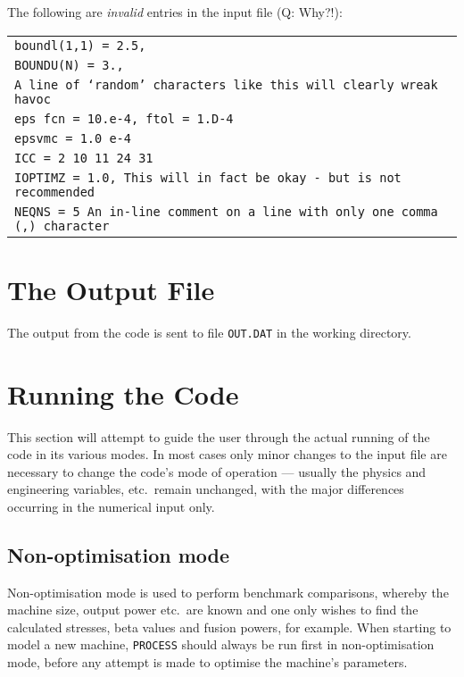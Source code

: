 \documentclass[11pt,a4paper]{report}
\newcommand{\process}{\mbox{\texttt{PROCESS}}}
\begin{document}
The following are \textit{invalid}\/ entries in the input file
(Q: Why?!):
\begin{center}
\begin{tabular}{||l}
$\!\!$\texttt{boundl(1,1) = 2.5,} \\
$\!\!$\texttt{BOUNDU(N) = 3.,} \\
$\!\!$\texttt{A line of `random' characters like this will clearly wreak havoc} \\
$\!\!$\texttt{eps fcn = 10.e-4, ftol = 1.D-4} \\
$\!\!$\texttt{epsvmc = 1.0 e-4} \\
$\!\!$\texttt{ICC =   2  10  11  24  31} \\
$\!\!$\texttt{IOPTIMZ = 1.0,  This will in fact be okay - but is not recommended} \\
$\!\!$\texttt{NEQNS = 5    An in-line comment on a line with only one comma (,) character} \\
\end{tabular}
\end{center}

\section{The Output File}

The output from the code is sent to file \texttt{OUT.DAT} in the working
directory.

\section{Running the Code}

This section will attempt to guide the user through the actual running of the
code in its various modes. In most cases only minor changes to the input file
are necessary to change the code's mode of operation --- usually the physics
and engineering variables, etc.\ remain unchanged, with the major differences
occurring in the numerical input only.

\subsection{Non-optimisation mode}

Non-optimisation mode is used to perform benchmark comparisons, whereby the
machine size, output power etc.\ are known and one only wishes to find the
calculated stresses, beta values and fusion powers, for example. When starting
to model a new machine, \process\/ should always be run first in non-optimisation
mode, before any attempt is made to optimise the machine's parameters.
\end{document}
